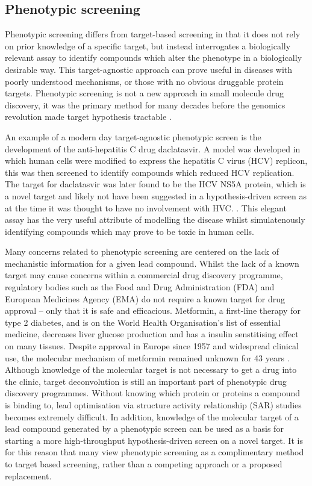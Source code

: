 \documentclass[a4paper,11pt,twoside,openright]{scrbook}
\begin{document}

\subsection{Phenotypic screening}
Phenotypic screening differs from target-based screening in that it does not rely on prior knowledge of a specific target, but instead interrogates a biologically relevant assay to identify compounds which alter the phenotype in a biologically desirable way.
This target-agnostic approach can prove useful in diseases with poorly understood mechanisms, or those with no obvious druggable protein targets.
Phenotypic screening is not a new approach in small molecule drug discovery, it was the primary method for many decades before the genomics revolution made target hypothesis tractable
\cite{Zheng2013}.

An example of a modern day target-agnostic phenotypic screen is the development of the anti-hepatitis C drug daclatasvir.
A model was developed in which human cells were modified to express the hepatitis C virus (HCV) replicon, this was then screened to identify compounds which reduced HCV replication.
The target for daclatasvir was later found to be the HCV NS5A protein, which is a novel target and likely not have been suggested in a hypothesis-driven screen as at the time it was thought to have no involvement with HVC. \cite{Belema2014,Nettles2014}.
This elegant assay has the very useful attribute of modelling the disease whilst simulatenously identifying compounds which may prove to be toxic in human cells.

Many concerns related to phenotypic screening are centered on the lack of mechanistic information for a given lead compound.
Whilst the lack of a known target may cause concerns within a commercial drug discovery programme, regulatory bodies such as the Food and Drug Administration (FDA) and European Medicines Agency (EMA) do not require a known target for drug approval -- only that it is safe and efficacious.
Metformin, a first-line therapy for type 2 diabetes, and is on the World Health Organisation's list of essential medicine, decreases liver glucose production and has a insulin senstitising effect on many tissues.
Despite approval in Europe since 1957 and widespread clinical use, the  molecular mechanism of metformin remained unknown for 43 years \cite{Hundal2000}.
Although knowledge of the molecular target is not necessary to get a drug into the clinic, target deconvolution is still an important part of phenotypic drug discovery programmes.
Without knowing which protein or proteins a compound is binding to, lead optimisation via structure activity relationship (SAR) studies becomes extremely difficult.
In addition, knowledge of the molecular target of a lead compound generated by a phenotypic screen can be used as a basis for starting a more high-throughput hypothesis-driven screen on a novel target.
It is for this reason that many view phenotypic screening as a complimentary method to target based screening, rather than a competing approach or a proposed replacement.
\end{document}
